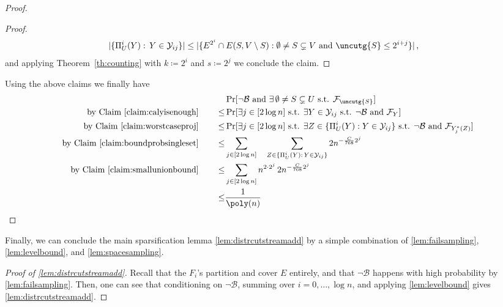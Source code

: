 \begin{proof}
\begin{proof}
	\begin{align*}
		|\{\Pi_U^i(Y) : \, Y \in \mathcal{Y}_{ij}\}|
		& \le |\{E^{2^i} \cap E(S,V\setminus S) : \emptyset \neq S \subsetneq V \text{ and } \uncutg{S} \le 2^{i+j}\}| \, ,
	\end{align*}
	and applying Theorem~\ref{th:counting} with $k \coloneqq 2^i$ and $s \coloneqq 2^j$ we conclude the claim.
\end{proof}
\noindent
Using the above claims we finally have
\begin{align*}
	& \Pr[\neg\mathcal{B} \text{ and } \exists \, \emptyset \neq S \subsetneq U \text{ s.t. } \mathcal{F}_{\uncutg{S}}] \\
	\text{by Claim~\ref{claim:calyisenough}} \quad  \quad \le & \Pr[\exists j \in [2\log n] \text{ s.t. } \exists Y \in \mathcal{Y}_{ij} \text{ s.t. } \neg\mathcal{B} \text{ and } \mathcal{F}_{Y}] \\
	\text{by Claim~\ref{claim:worstcaseproj}} \quad  \quad \le & \Pr[\exists j \in [2\log n] \text{ s.t. } \exists Z \in \{\Pi_U^i(Y): Y \in \mathcal{Y}_{ij}\} \text{ s.t. }  \neg\mathcal{B} \text{ and } \mathcal{F}_{Y_j^*(Z)}] \\
	\text{by Claim~\ref{claim:boundprobsingleset}} \quad  \quad \le & \sum_{j \in [2\log n]} \quad \sum_{ Z \in \{\Pi_U^i(Y) : \, Y \in \mathcal{Y}_{ij}\}} 2n^{-\frac{C}{768}2^j} \\
	\text{by Claim~\ref{claim:smallunionbound}} \quad  \quad \le & \sum_{j \in [2\log n]} n^{2 \cdot 2^{j}}\, 2n^{-\frac{C}{768}2^j} \\
	\le & \frac{1}{\poly(n)}
\end{align*}
\end{proof}
\noindent
Finally, we can conclude the main sparsification lemma \cref{lem:distrcutstreamadd} by a simple combination of \cref{lem:failsampling}, \cref{lem:levelbound}, and \cref{lem:spacesampling}.

\begin{proof}[Proof of \cref{lem:distrcutstreamadd}]
Recall that the $F_i$'s partition and cover $E$ entirely, and that $\neg\mathcal{B}$ happens with high probability by \cref{lem:failsampling}. Then, one can see that conditioning on $\neg \mathcal{B}$, summing over $i=0,\dots, \log n$, and applying \cref{lem:levelbound} gives \cref{lem:distrcutstreamadd}.
\end{proof}